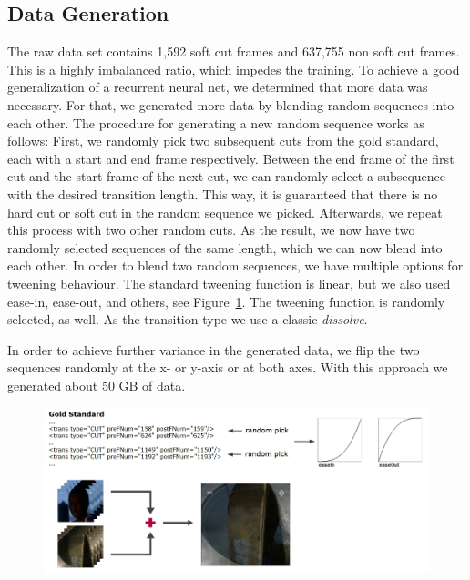 \subsection{Data Generation}
\label{sec:soft_cut_data_generation}

The raw data set contains 1,592 soft cut frames and 637,755 non soft cut frames.
This is a highly imbalanced ratio, which impedes the training.
To achieve a good generalization of a recurrent neural net, we determined that more data was necessary.
For that, we generated more data by blending random sequences into each other.
The procedure for generating a new random sequence works as follows:
First, we randomly pick two subsequent cuts from the gold standard, each with a start and end frame respectively.
Between the end frame of the first cut and the start frame of the next cut, we can randomly select a subsequence with the desired transition length.
This way, it is guaranteed that there is no hard cut or soft cut in the random sequence we picked.
Afterwards, we repeat this process with two other random cuts.
As the result, we now have two randomly selected sequences of the same length, which we can now blend into each other.
In order to blend two random sequences, we have multiple options for tweening behaviour.
The standard tweening function is linear, but we also used ease-in, ease-out, and others, see Figure~\ref{fig:data_generation}.
The tweening function is randomly selected, as well.
As the transition type we use a classic \textit{dissolve}.

In order to achieve further variance in the generated data, we flip the two sequences randomly at the x- or y-axis or at both axes.
With this approach we generated about 50 GB of data.

\begin{figure}
    \centering
    \includegraphics[scale=.5]{images/data_generation.jpg}
    \caption{}
    \label{fig:data_generation}
\end{figure}
